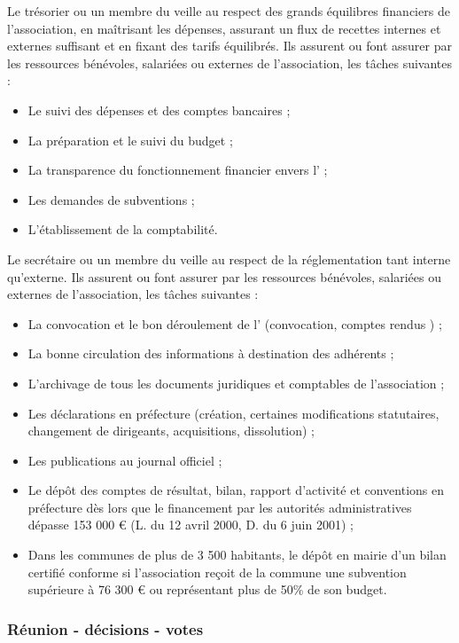 \documentclass[a4paper,french,10pt]{article}
\begin{document}
Le trésorier ou un membre du \bureau{} veille au respect des grands équilibres financiers de l’association, en maîtrisant les dépenses, assurant un flux de recettes internes et externes suffisant et en fixant des tarifs équilibrés. Ils assurent ou font assurer par les ressources bénévoles, salariées ou externes de l’association, les tâches suivantes :
\begin{itemize}
\item Le suivi des dépenses et des comptes bancaires ;
\item La préparation et le suivi du budget ;
\item La transparence du fonctionnement financier envers l’\AG{} ;
\item Les demandes de subventions ;
\item L’établissement de la comptabilité.
\end{itemize}

Le secrétaire ou un membre du \bureau{} veille au respect de la réglementation tant interne qu’externe. Ils assurent ou font assurer par les ressources bénévoles, salariées ou externes de l’association, les tâches suivantes :
\begin{itemize}
\item La convocation et le bon déroulement de l’\AG{} (convocation, comptes rendus ) ;
\item La bonne circulation des informations à destination des adhérents ;
\item L’archivage de tous les documents juridiques et comptables de l’association ;
\item Les déclarations en préfecture (création, certaines modifications statutaires, changement de dirigeants, acquisitions, dissolution) ;
\item Les publications au journal officiel ;
\item Le dépôt des comptes de résultat, bilan, rapport d’activité et conventions en préfecture dès lors que le financement par les autorités administratives dépasse 153 000 \euro{} (L. du 12 avril 2000, D. du 6 juin 2001) ;
\item Dans les communes de plus de 3 500 habitants, le dépôt en mairie d’un bilan certifié conforme si l’association reçoit de la commune une subvention supérieure à 76 300 \euro{} ou représentant plus de 50\% de son budget.
\end{itemize}

\subsubsection*{Réunion - décisions - votes}
\end{document}
